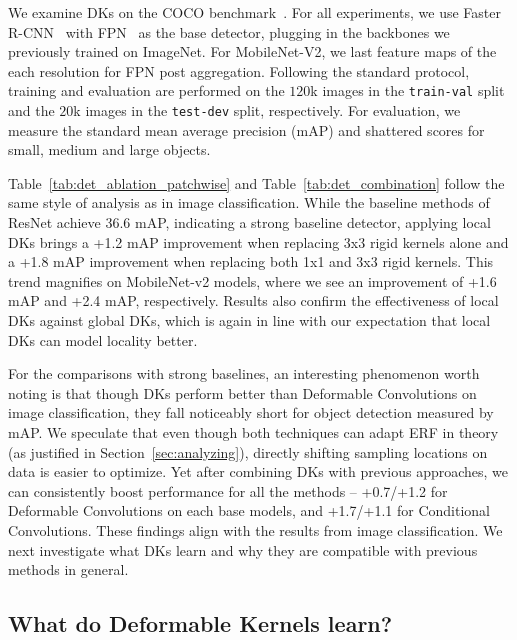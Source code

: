\documentclass{article} \usepackage{iclr2020_conference, times}
\begin{document}
We examine DKs on the COCO benchmark~\citep{lin2014microsoft}.
For all experiments, we use Faster R-CNN~\citep{ren2015faster} with
FPN~\citep{lin2017feature} as the base detector, plugging in the backbones we
previously trained on ImageNet.
For MobileNet-V2, we last feature maps of the each resolution for FPN post
aggregation.
Following the standard protocol, training and evaluation are performed on the
$120$k images in the \texttt{train-val} split and the $20$k images in the
\texttt{test-dev} split, respectively.
For evaluation, we measure the standard mean average precision (mAP) and
shattered scores for small, medium and large objects.

Table~\ref{tab:det_ablation_patchwise} and Table~\ref{tab:det_combination}
follow the same style of analysis as in image classification.
While the baseline methods of ResNet achieve 36.6 mAP, indicating a strong
baseline detector, applying local DKs brings a +1.2 mAP
improvement when replacing 3x3 rigid kernels alone and a +1.8 mAP improvement
when replacing both 1x1 and 3x3 rigid kernels.
This trend magnifies on MobileNet-v2 models, where we see an improvement of
+1.6 mAP and +2.4 mAP, respectively.
Results also confirm the effectiveness of local DKs against global DKs, which
is again in line with our expectation that local DKs can model locality better.

For the comparisons with strong baselines,
an interesting phenomenon worth noting is that though DKs perform better than
Deformable Convolutions on image classification, they fall noticeably short for
object detection measured by mAP.
We speculate that even though both techniques can adapt ERF in theory (as
justified in Section~\ref{sec:analyzing}), directly shifting sampling locations
on data is easier to optimize.
Yet after combining DKs with previous approaches, we can consistently boost performance
for all the methods -- +0.7/+1.2 for Deformable Convolutions on each base
models, and +1.7/+1.1 for Conditional Convolutions.
These findings align with the results from image classification.
We next investigate what DKs learn and why they are compatible with previous
methods in general.


\subsection{What do Deformable Kernels learn?} \label{sec:understanding}
\end{document}
